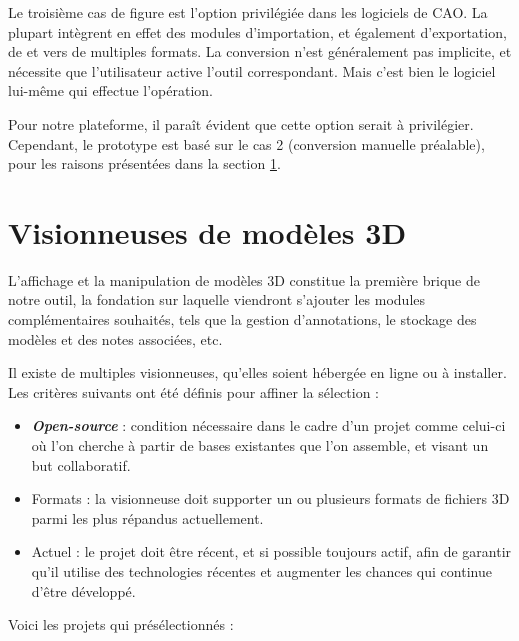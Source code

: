 Le troisième cas de figure est l'option privilégiée dans les logiciels de CAO. La plupart intègrent en effet des modules d'importation, et également d'exportation, de et vers de multiples formats.
La conversion n'est généralement pas implicite, et nécessite que l'utilisateur active l'outil correspondant. Mais c'est bien le logiciel lui-même qui effectue l'opération.

Pour notre plateforme, il paraît évident que cette option serait à privilégier. Cependant, le prototype est basé sur le cas 2 (conversion manuelle préalable), pour les raisons présentées dans la section \ref{sec:3d-model-viewers}.

\section{Visionneuses de modèles 3D}
\label{sec:3d-model-viewers}

L'affichage et la manipulation de modèles 3D constitue la première brique de notre outil, la fondation sur laquelle viendront s'ajouter les modules complémentaires souhaités, tels que la gestion d'annotations, le stockage des modèles et des notes associées, etc.

Il existe de multiples visionneuses, qu'elles soient hébergée en ligne ou à installer.
Les critères suivants ont été définis pour affiner la sélection :

\begin{itemize}
    \item \textbf{\textit{Open-source}} : condition nécessaire dans le cadre d'un projet comme celui-ci où l'on cherche à partir de bases existantes que l'on assemble, et visant un but collaboratif.
    \item Formats : la visionneuse doit supporter un ou plusieurs formats de fichiers 3D parmi les plus répandus actuellement.
    \item Actuel : le projet doit être récent, et si possible toujours actif, afin de garantir qu'il utilise des technologies récentes et augmenter les chances qui continue d'être développé.
\end{itemize}

Voici les projets qui présélectionnés :

